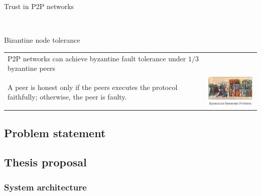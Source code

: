 \documentclass[12pt]{beamer}
\renewcommand{\frametitle}[1]{\vspace{0.2cm}\begin{huge}#1\end{huge}}
\renewcommand{\framesubtitle}[1]{\\ \vspace{0.4cm} \hspace{0.4cm}\begin{large}#1\end{large}}
\begin{document}
  
  \begin{frame}
  \frametitle{Trust in P2P networks}
  \framesubtitle{Bizantine node tolerance}
  \begin{table}
  \begin{tabular}{p{7cm}p{3cm}}
    P2P networks can achieve byzantine fault tolerance under $1/3$ byzantine
    peers\\
    A peer is honest only if the peers executes the protocol faithfully;
    otherwise, the peer is faulty.
  &
  \vspace{1.5cm}
  \includegraphics[width=4cm]{../../presentacion/img/bizantine_generals_problem}\\
  \end{tabular}
  \end{table}
  \end{frame}



  

  \subsection{Problem statement}


  \subsection{Thesis proposal}

  \subsubsection{System architecture}
\end{document}
